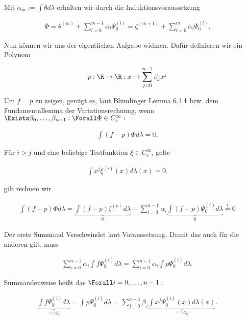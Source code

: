 \begin{solution}
Mit $\alpha_m:=\int\theta d\lambda$ erhalten wir durch die Induktionsvoraussetzung

\begin{align*}
  \Phi
  = \theta^{(m)} +
    \sum_{l=0}^{m-1}
    \alpha_l \Psi_0^{(l)}
  = \zeta^{(m+1)} +
    \sum_{l=0}^{m}
    \alpha_l \Psi_0^{(l)}.
\end{align*}

Nun können wir uns der eigentlichen Aufgabe widmen. Dafür definieren wir ein Polynom

\begin{align*}
    p: \R \to \R: x \mapsto \sum_{j=0}^{n-1} \beta_j x^j
\end{align*}

Um $f = p$ zu zeigen, genügt es, laut Blümlinger Lemma 6.1.1 bzw. dem Fundamentallemma der Variationsrechnung, wenn $\Exists \beta_0, \dots, \beta_{n-1}: \Forall \Phi \in C_c^\infty:$

\begin{align}
    \int (f-p) \Phi d \lambda = 0. \label{eq:wunsch}
\end{align}

Für $i>j$ und eine beliebige Testfunktion $\xi \in C_c^\infty$, gelte

\begin{align*}
    \int x^j \xi^{(i)}(x) d \lambda(x) = 0.
\end{align*}

gilt rechnen wir

\begin{align*}
  \int (f-p) \Phi d \lambda
  = \underbrace{\int (f-p) \zeta^{(n)} d \lambda}_0 +
    \sum_{i=0}^{n-1} \alpha_i
    \underbrace{\int(f-p) \Psi_0^{(i)} d \lambda}_0
  \stackrel{!}{=} 0
\end{align*}

Der erste Summand Verschwindet laut Voraussetzung. Damit das auch für die anderen gilt, muss

\begin{align*}
    \sum_{i=0}^{n-1} \alpha_i
    \int f \Psi_0^{(i)} d \lambda =
    \sum_{i=0}^{n-1}
    \alpha_i
    \int p \Psi_0^{(i)} d \lambda.
\end{align*}

Summandenweise heißt das $\Forall i = 0, \dots, n-1:$

\begin{align*}
    \underbrace{\int f \Psi_0^{(i)} d \lambda}_{=: b_i}
    = \int p \Psi_0^{(i)} d \lambda
    = \sum_{j=0}^{n-1}
      \beta_j
      \underbrace{\int x^j \Psi_0^{(i)}(x) d \lambda(x)}_{=: a_{ij}}.
\end{align*}


\end{solution}
